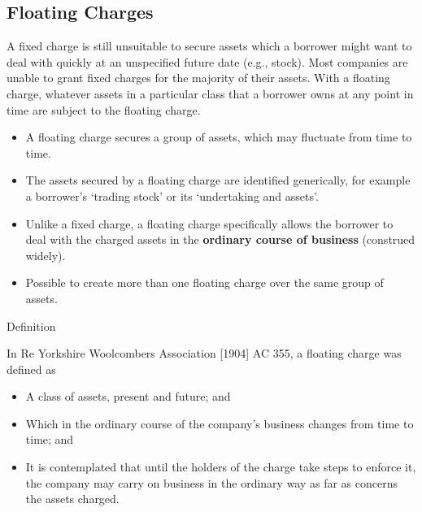 \documentclass[
]{article}
\providecommand{\tightlist}{%
  \setlength{\itemsep}{0pt}\setlength{\parskip}{0pt}}
\newenvironment{env-8872a5c8-2356-4b38-87ff-b8a967f137b3}
{
    \savenotes\tcolorbox[blanker,breakable,left=5pt,borderline west={2pt}{-4pt}{yellow}]
}
{
    \endtcolorbox\spewnotes
}
\begin{document}
\hypertarget{floating-charges}{%
\subsection{Floating Charges}\label{floating-charges}}

A fixed charge is still unsuitable to secure assets which a borrower
might want to deal with quickly at an unspecified future date (e.g.,
stock). Most companies are unable to grant fixed charges for the
majority of their assets. With a floating charge, whatever assets in a
particular class that a borrower owns at any point in time are subject
to the floating charge.

\begin{itemize}
\tightlist
\item
  A floating charge secures a group of assets, which may fluctuate from
  time to time.
\item
  The assets secured by a floating charge are identified generically,
  for example a borrower's `trading stock' or its `undertaking and
  assets'.
\item
  Unlike a fixed charge, a floating charge specifically allows the
  borrower to deal with the charged assets in the \textbf{ordinary
  course of business} (construed widely).
\item
  Possible to create more than one floating charge over the same group
  of assets.
\end{itemize}

\begin{env-8872a5c8-2356-4b38-87ff-b8a967f137b3}

Definition

In Re Yorkshire Woolcombers Association {[}1904{]} AC 355, a floating
charge was defined as

\begin{itemize}
\tightlist
\item
  A class of assets, present and future; and
\item
  Which in the ordinary course of the company's business changes from
  time to time; and
\item
  It is contemplated that until the holders of the charge take steps to
  enforce it, the company may carry on business in the ordinary way as
  far as concerns the assets charged.
\end{itemize}

\end{env-8872a5c8-2356-4b38-87ff-b8a967f137b3}
\end{document}
